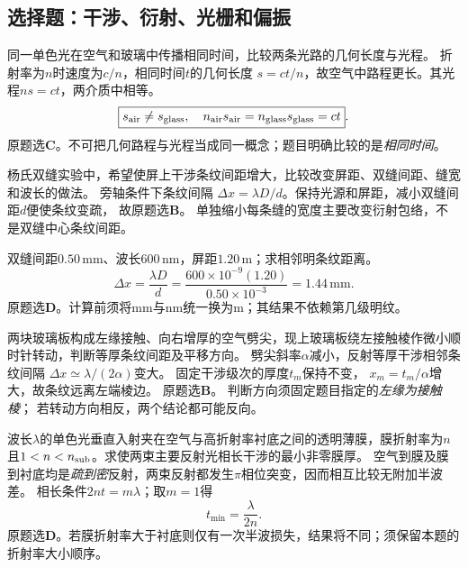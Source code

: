 \subsection{选择题：干涉、衍射、光栅和偏振}

\problemtext 同一单色光在空气和玻璃中传播相同时间，比较两条光路的几何长度与光程。
\workings
折射率为$n$时速度为$c/n$，相同时间$t$的几何长度
$s=ct/n$，故空气中路程更长。其光程$ns=ct$，两介质中相等。
\[
\boxed{s_{\rm air}\ne s_{\rm glass},\quad
n_{\rm air}s_{\rm air}=n_{\rm glass}s_{\rm glass}=ct}.
\]
原题选\textbf{C}。\crosscheck 不可把几何路程与光程当成同一概念；题目明确比较的是\emph{相同时间}。

\problemtext 杨氏双缝实验中，希望使屏上干涉条纹间距增大，比较改变屏距、双缝间距、缝宽和波长的做法。
\workings
旁轴条件下条纹间隔
$\Delta x=\lambda D/d$。保持光源和屏距，减小双缝间距$d$便使条纹变疏，
故原题选\textbf{B}。
\crosscheck 单独缩小每条缝的宽度主要改变衍射包络，不是双缝中心条纹间距。

\problemtext 双缝间距$0.50\,\mathrm{mm}$、波长$600\,\mathrm{nm}$，屏距$1.20\,\mathrm m$；求相邻明条纹距离。
\workings
\[
\boxed{\Delta x=\frac{\lambda D}{d}
=\frac{600\times10^{-9}(1.20)}{0.50\times10^{-3}}
=1.44\,\mathrm{mm}}.
\]
原题选\textbf{D}。\crosscheck 计算前须将mm与nm统一换为m；其结果不依赖第几级明纹。

\problemtext 两块玻璃板构成左缘接触、向右增厚的空气劈尖，现上玻璃板绕左接触棱作微小顺时针转动，判断等厚条纹间距及平移方向。
\workings
劈尖斜率$\alpha$减小，反射等厚干涉相邻条纹间隔
$\Delta x\simeq\lambda/(2\alpha)$变大。
固定干涉级次的厚度$t_m$保持不变，
$x_m=t_m/\alpha$增大，故条纹远离左端棱边。
原题选\textbf{B}。
\crosscheck 判断方向须固定题目指定的\emph{左缘为接触棱}；
若转动方向相反，两个结论都可能反向。

\problemtext 波长$\lambda$的单色光垂直入射夹在空气与高折射率衬底之间的透明薄膜，膜折射率为$n$且$1<n<n_{\rm sub}$。求使两束主要反射光相长干涉的最小非零膜厚。
\workings
空气到膜及膜到衬底均是\emph{疏到密}反射，两束反射都发生$\pi$相位突变，因而相互比较无附加半波差。
相长条件$2nt=m\lambda$；取$m=1$得
\[
\boxed{t_{\min}=\frac{\lambda}{2n}}.
\]
原题选\textbf{D}。\crosscheck 若膜折射率大于衬底则仅有一次半波损失，结果将不同；须保留本题的折射率大小顺序。

